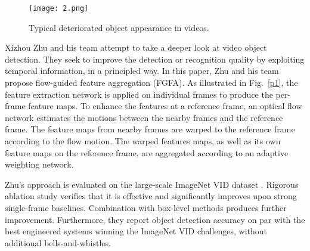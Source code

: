 \documentclass[10pt,twocolumn,letterpaper]{article}
\begin{document}
\begin{figure}
	\begin{center}
		\texttt{[image: 2.png]}
	\end{center}
	\caption{Typical deteriorated object appearance in videos.}
	\label{p2}
\end{figure}

Xizhou Zhu and his team attempt to take a deeper look at video object detection. They seek to improve the detection or recognition quality by exploiting temporal information, in a principled way. In this paper, Zhu and his team propose flow-guided feature aggregation (FGFA). As illustrated in Fig.~\ref{p1}, the feature extraction network is applied on individual frames to produce the per-frame feature maps. To enhance the features at a reference frame, an optical flow network \cite{Dosovitskiy2015FlowNet} estimates the motions between the nearby frames and the reference frame. The feature maps from nearby frames are warped to the reference frame according to the flow motion. The warped features maps, as well as its own feature maps on the reference frame, are aggregated according to an adaptive weighting network.

Zhu's approach is evaluated on the large-scale ImageNet VID dataset \cite{Russakovsky2015ImageNet}. Rigorous ablation study verifies that it is effective and significantly improves upon strong single-frame baselines. Combination with box-level methods produces further improvement. Furthermore, they report object detection accuracy on par with the best engineered systems winning the ImageNet VID challenges, without additional bells-and-whistles.
\begin{table*}[b]
	\caption{Results of using different number of frames in training and inference, using ResNet-50. Default parameters are indicated by.}\label{t1}
	\begin{center}
		\end{center}
	\end{table*}
\end{document}
